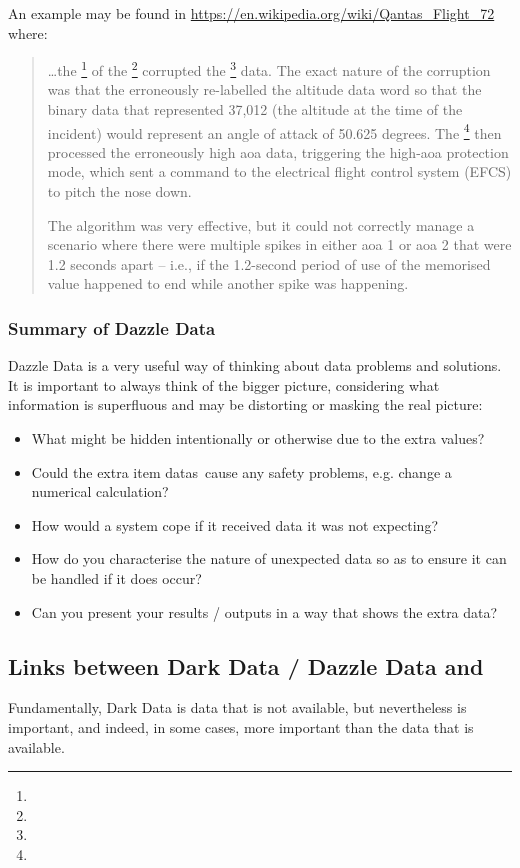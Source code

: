 An example may be found in
\href{https://en.wikipedia.org/wiki/Qantas\_Flight\_72}{https://en.wikipedia.org/wiki/Qantas\_Flight\_72}
where:
\begin{quotation}
  \dots the \footnote{} of the \footnote{} corrupted the \footnote{} data. The exact nature of the corruption was that the   erroneously re-labelled the altitude data word so that the binary data that represented 37,012 (the altitude at the time of the incident) would represent an angle of attack of 50.625 degrees. The \footnote{} then processed the erroneously high \gls{aoa} data, triggering the high-\gls{aoa} protection mode, which sent a command to the electrical flight control system (EFCS) to pitch the nose down.
  
  The  algorithm was very effective, but it could not correctly manage a scenario where there were multiple spikes in either \gls{aoa} 1 or \gls{aoa} 2 that were 1.2 seconds apart -- i.e., if the 1.2-second period of use of the memorised value happened to end while another spike was happening.
  \end{quotation}
\subsubsection{Summary of Dazzle Data}
Dazzle Data is a very useful way of thinking about data problems and solutions.
It is important to always think of the bigger picture,
considering what \gls{information} is superfluous and may be distorting or masking the real picture:
\begin{itemize}
    \item What might be hidden intentionally or otherwise due to the extra values?
    \item Could the extra \cbstart\glspl{item data}\cbend\ cause any safety problems, e.g. change a numerical calculation?
    \item How would a system cope if it received data it was not expecting?
    \item How do you characterise the nature of unexpected data so as to ensure it can be handled if it does occur?
    \item Can you present your results / outputs in a way that shows the extra data?
\end{itemize}
%
%
\subsection{Links between Dark Data / Dazzle Data and }
Fundamentally, Dark Data is data that is not available, but nevertheless is important, and indeed, in some cases, more important than the data that is available.

